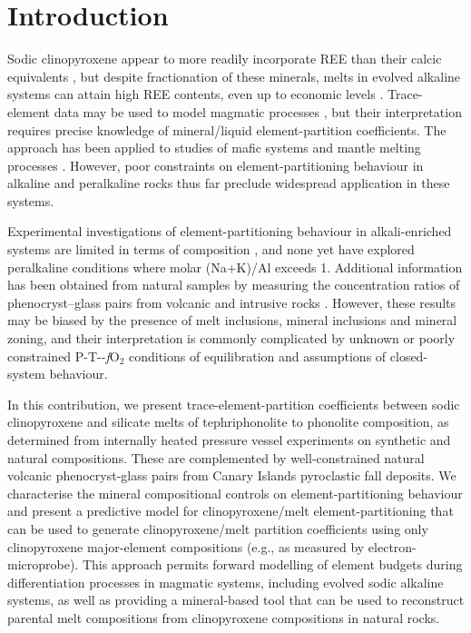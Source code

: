 \documentclass[final,authoryear,3p,times,twocolumn]{elsarticle}
\newcommand{\fO}{\textit{f}O$_{2}$ }
\begin{document}
\section{Introduction}
Sodic clinopyroxene appear to more readily incorporate REE than their calcic equivalents \citep{Marks2004}, but despite fractionation of these minerals, melts in evolved alkaline systems can attain high REE contents, even up to economic levels \citep{Kogarko1990,Downes2005,Marks2011,Sjoqvist2013,Goodenough2016,Moller2016}. Trace-element data may be used to model magmatic processes \citep{Spera2001, Troll2002, Boudreau2004,Xu2010,Girnis2013,Mungall2014}, but their interpretation requires precise knowledge of mineral/liquid element-partition coefficients. The approach has been applied to studies of mafic systems and mantle melting processes \citep[][]{Niu2004, Workman2005, Foley2013, Coumans2016, Peters2017}. However, poor constraints on element-partitioning behaviour in alkaline and peralkaline rocks thus far preclude widespread application in these systems.

Experimental investigations of element-partitioning behaviour in alkali-enriched systems are limited in terms of composition \citep{Wood2001cpx, Huang2006}, and none yet have explored peralkaline conditions where molar (Na+K)/Al exceeds 1. Additional information has been obtained from natural samples by measuring the concentration ratios of phenocryst--glass pairs from volcanic and intrusive rocks \citep{Larsen1979, Worner1983, Shearer1994, Severs2009, Fedele2009, Mollo2016}. However, these results may be biased by the presence of melt inclusions, mineral inclusions and mineral zoning, and their interpretation is commonly complicated by unknown or poorly constrained P-T--\fO conditions of equilibration and assumptions of closed-system behaviour.

In this contribution, we present trace-element-partition coefficients between sodic clinopyroxene and silicate melts of tephriphonolite to phonolite composition, as determined from internally heated pressure vessel experiments on synthetic and natural compositions. These are complemented by well-constrained natural volcanic phenocryst-glass pairs from Canary Islands pyroclastic fall deposits.
We characterise the mineral compositional controls on element-partitioning behaviour and present a predictive model for clinopyroxene/melt element-partitioning that can be used to generate clinopyroxene/melt partition coefficients using only clinopyroxene major-element compositions (e.g., as measured by electron-microprobe). This approach permits forward modelling of element budgets during differentiation processes in magmatic systems, including evolved sodic alkaline systems, as well as providing a mineral-based tool that can be used to reconstruct parental melt compositions from clinopyroxene compositions in natural rocks.
\end{document}
